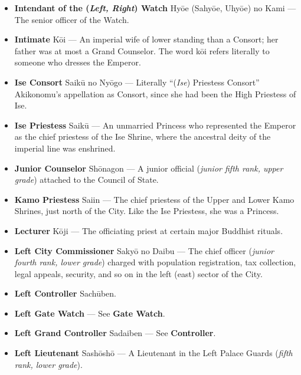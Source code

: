 \documentclass{article}
\begin{document}
\begin{multicols}{2}
\begin{small}
\begin{itemize}[
				label=,
				leftmargin=0em,
				rightmargin=-1.5em,
				itemindent=-2em,
			]
			\item \textbf{Intendant of the (\textit{Left, Right}) Watch} Hyōe (Sahyōe, Uhyōe) no Kami --- The senior officer of the Watch.

			\item \textbf{Intimate} Kōi --- An imperial wife of lower standing than a Consort; her father was at most a Grand Counselor. The word kōi refers literally to someone who dresses the Emperor.

			\item \textbf{Ise Consort} Saikū no Nyōgo --- Literally ``(\textit{Ise}) Priestess Consort'' Akikonomu's appellation as Consort, since she had been the High Priestess of Ise.

			\item \textbf{Ise Priestess} Saikū --- An unmarried Princess who represented the Emperor as the chief priestess of the Ise Shrine, where the ancestral deity of the imperial line was enshrined.

			\item \textbf{Junior Counselor} Shōnagon --- A junior official (\textit{junior fifth rank, upper grade}) attached to the Council of State.

			\item \textbf{Kamo Priestess} Saiin --- The chief priestess of the Upper and Lower Kamo Shrines, just north of the City. Like the Ise Priestess, she was a Princess.

			\item \textbf{Lecturer} Kōji --- The officiating priest at certain major Buddhist rituals.

			\item \textbf{Left City Commissioner} Sakyō no Daibu --- The chief officer (\textit{junior fourth rank, lower grade}) charged with population registration, tax collection, legal appeals, security, and so on in the left (east) sector of the City.

			\item \textbf{Left Controller} Sachūben.

			\item \textbf{Left Gate Watch} --- See \textbf{Gate Watch}.

			\item \textbf{Left Grand Controller} Sadaiben --- See \textbf{Controller}.

			\item \textbf{Left Lieutenant} Sashōshō --- A Lieutenant in the Left Palace Guards (\textit{fifth rank, lower grade}).


\end{itemize}
\end{small}
\end{multicols}
\end{document}
